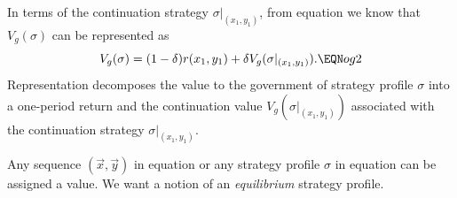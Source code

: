 
%

In terms of the continuation strategy $\sigma\vert_{(x_1,y_1)}$,
from equation  we know that $V_g(\sigma)$ can be represented
as
$$ V_g(\sigma) = (1-\delta) r(x_1, y_1) + \delta V_g(\sigma\vert_{(x_1,
     y_1)}).   \EQN og2   $$
Representation  decomposes the value to the government of strategy
profile $\sigma$ into a one-period return and the continuation value
$V_g(\sigma\vert_{(x_1,y_1)})$ associated with the continuation
strategy $\sigma\vert_{(x_1,y_1)}$.

Any sequence $(\vec{x},\vec{y})$ in equation  or any strategy profile
$\sigma$ in equation  can be assigned a value.
We want a notion of an {\it equilibrium\/}  strategy profile.



